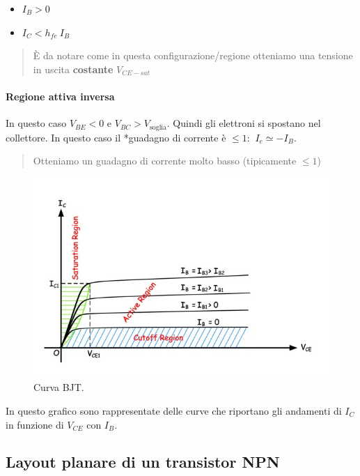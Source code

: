 \documentclass[
]{book}
\providecommand{\tightlist}{%
  \setlength{\itemsep}{0pt}\setlength{\parskip}{0pt}}
\begin{document}
\begin{itemize}
\tightlist
\item
  \(I_{B}>0\)
\item
  \(I_C < h_{fe}\ I_{B}\)
\end{itemize}

\begin{quote}
È da notare come in questa configurazione/regione otteniamo una tensione
in uscita \textbf{costante} \(V_{CE - sat}\)
\end{quote}

\paragraph{Regione attiva inversa}\label{regione-attiva-inversa}

In questo caso \(V_{BE}<0\) e \(V_{BC} > V_{\text{soglia}}\). Quindi gli
elettroni si spostano nel collettore. In questo caso il *guadagno di
corrente è \(\leq 1\): \(\ I_{e} \simeq - I_{B}\).

\begin{quote}
Otteniamo un guadagno di corrente molto basso (tipicamente \(\leq 1\))
\end{quote}

\begin{figure}
\centering
\includegraphics[width=0.7\linewidth,height=\textheight,keepaspectratio]{assets/imgs/curva_bjt_npn.png}
\caption{Curva BJT.}
\end{figure}

In questo grafico sono rappresentate delle curve che riportano gli
andamenti di \(I_C\) in funzione di \(V_{CE}\) con \(I_B\).

\subsection{Layout planare di un transistor
NPN}\label{layout-planare-di-un-transistor-npn}
\end{document}
